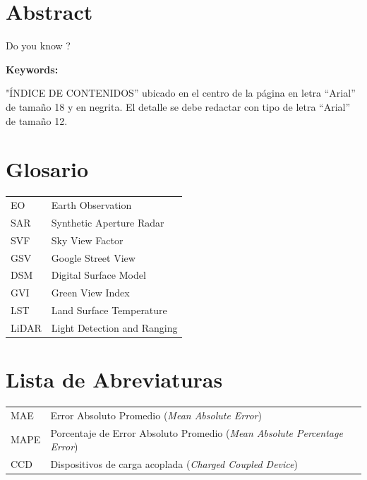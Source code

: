 \documentclass[12pt,oneside,a4paper]{book}
\begin{document}
\chapter*{Abstract}
 Do you know ?
 
\noindent \textbf{Keywords:} 

\tableofcontents    %

"ÍNDICE DE CONTENIDOS” ubicado en el centro de la página en letra “Arial” de tamaño 18
y en negrita.
El detalle se debe redactar con tipo de letra “Arial” de tamaño 12.

\chapter*{Glosario}
\begin{tabular}{ll}
	EO & Earth Observation \\
	SAR & Synthetic Aperture Radar\\
	SVF & Sky View Factor \\
	GSV & Google Street View\\ 
	DSM & Digital Surface Model\\
	GVI & Green View Index\\
	LST & Land Surface Temperature \\
	LiDAR & Light Detection and Ranging
 \end{tabular}

\chapter*{Lista de Abreviaturas}
\begin{tabular}{ll}
         MAE     & Error Absoluto Promedio (\emph{Mean Absolute Error})\\
         MAPE    & Porcentaje de Error Absoluto Promedio (\emph{Mean Absolute Percentage Error})\\
         CCD 	 & Dispositivos de carga acoplada (\emph{Charged Coupled Device})\\
\end{tabular}
\end{document}
